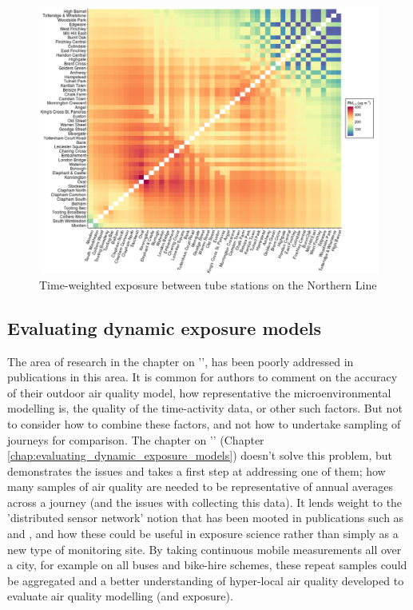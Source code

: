\begin{figure}[H]
\centering
\includegraphics[scale=0.6]{images/time_weighted_tube_exposure}
\caption{Time-weighted exposure between tube stations on the Northern Line}
\label{fig:time_weighted_tube_exposure}
\end{figure}

\subsection{Evaluating dynamic exposure models}
\label{evaluation_wrapup}

The area of research in the chapter on '', has been poorly addressed in publications in this area. It is common for authors to comment on the accuracy of their outdoor air quality model, how representative the microenvironmental modelling is, the quality of the time-activity data, or other such factors. But not to consider how to combine these factors, and not how to undertake sampling of journeys for comparison. The chapter on '' (Chapter \ref{chap:evaluating_dynamic_exposure_models}) doesn't solve this problem, but demonstrates the issues and takes a first step at addressing one of them; how many samples of air quality are needed to be representative of annual averages across a journey (and the issues with collecting this data). It lends weight to the 'distributed sensor network' notion that has been mooted in publications such as \cite{Moltchanov2015} and \cite{Broday2017}, and how these could be useful in exposure science rather than simply as a new type of monitoring site. By taking continuous mobile measurements all over a city, for example on all buses and bike-hire schemes, these repeat samples could be aggregated and a better understanding of hyper-local air quality developed to evaluate air quality modelling (and exposure).

